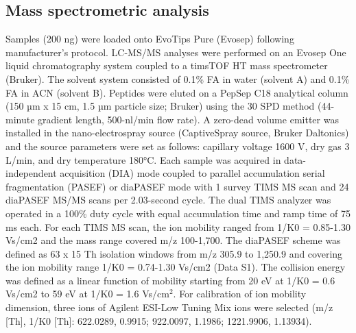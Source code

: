 \begin{refsection}
    \subsection{Mass spectrometric analysis}
    Samples (200 ng) were loaded onto EvoTips Pure (Evosep) following manufacturer’s protocol. LC-MS/MS analyses were performed on an Evosep One liquid chromatography system coupled to a timsTOF HT mass spectrometer (Bruker). The solvent system consisted of 0.1\% FA in water (solvent A) and 0.1\% FA in ACN (solvent B). Peptides were eluted on a PepSep C18 analytical column (150 µm x 15 cm, 1.5 µm particle size; Bruker) using the 30 SPD method (44-minute gradient length, 500-nl/min flow rate). A zero-dead volume emitter was installed in the nano-electrospray source (CaptiveSpray source, Bruker Daltonics) and the source parameters were set as follows: capillary voltage 1600 V, dry gas 3 L/min, and dry temperature 180°C. Each sample was acquired in data-independent acquisition (DIA) mode coupled to parallel accumulation serial fragmentation (PASEF) or diaPASEF mode\cite{meier2020a} with 1 survey TIMS MS scan and 24 diaPASEF MS/MS scans per 2.03-second cycle. The dual TIMS analyzer was operated in a 100\% duty cycle with equal accumulation time and ramp time of 75 ms each. For each TIMS MS scan, the ion mobility ranged from 1/K0 = 0.85-1.30 Vs/cm2 and the mass range covered m/z 100-1,700. The diaPASEF scheme was defined as 63 x 15 Th isolation windows from m/z 305.9 to 1,250.9 and covering the ion mobility range 1/K0 = 0.74-1.30 Vs/cm2 (Data S1). The collision energy was defined as a linear function of mobility starting from 20 eV at 1/K0 = 0.6 Vs/cm2 to 59 eV at 1/K0 = 1.6 Vs/cm$^2$. For calibration of ion mobility dimension, three ions of Agilent ESI-Low Tuning Mix ions were selected (m/z [Th], 1/K0 [Th]: 622.0289, 0.9915; 922.0097, 1.1986; 1221.9906, 1.13934).
    

\end{refsection}
